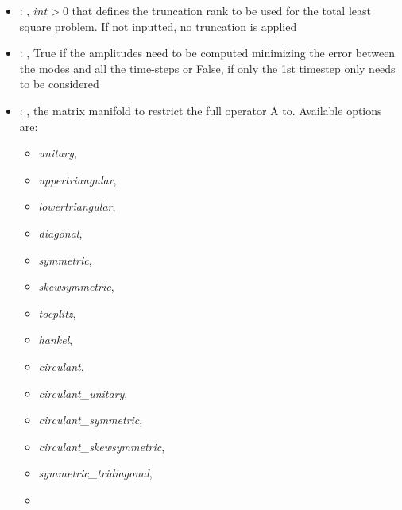 \begin{itemize}
    \item {}: , 
      $int > 0$ that defines the truncation rank to be used for the total
      least square problem. If not inputted, no truncation is applied

    \item {}: , 
      True if the amplitudes need to be computed minimizing the error
      between the modes and all the time-steps or False, if only the 1st timestep only needs to be
      considered

    \item {}: , 
      the matrix manifold to restrict the full operator A to. Available options are:
      \begin{itemize}                                                   \item \textit{unitary},
      \item \textit{uppertriangular},                                                   \item
      \textit{lowertriangular},                                                   \item
      \textit{diagonal},                                                   \item \textit{symmetric},
      \item \textit{skewsymmetric},                                                   \item
      \textit{toeplitz},                                                   \item \textit{hankel},
      \item \textit{circulant},                                                   \item
      \textit{circulant\_unitary},                                                   \item
      \textit{circulant\_symmetric},                                                   \item
      \textit{circulant\_skewsymmetric},                                                   \item
      \textit{symmetric\_tridiagonal},                                                   \item

\end{itemize}
\end{itemize}
